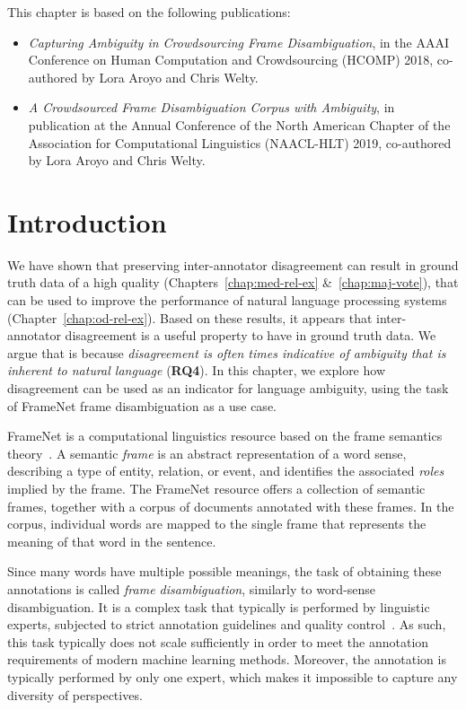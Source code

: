 This chapter is based on the following publications:
\begin{itemize}
    \item \textit{Capturing Ambiguity in Crowdsourcing Frame Disambiguation}, in the AAAI Conference on Human Computation and Crowdsourcing (HCOMP) 2018, co-authored by Lora Aroyo and Chris Welty.~\cite{DBLP:conf/hcomp/DumitracheAW18}
    
    \item \textit{A Crowdsourced Frame Disambiguation Corpus with Ambiguity}, in publication at the Annual Conference of the North American Chapter of the Association for Computational Linguistics (NAACL-HLT) 2019, co-authored by Lora Aroyo and Chris Welty.~\cite{dumitrache2019frames}
\end{itemize}


\section{Introduction}


We have shown that preserving inter-annotator disagreement can result in ground truth data of a high quality (Chapters~\ref{chap:med-rel-ex} \&~\ref{chap:maj-vote}), that can be used to improve the performance of natural language processing systems (Chapter~\ref{chap:od-rel-ex}). Based on these results, it appears that inter-annotator disagreement is a useful property to have in ground truth data. We argue that is because \textit{disagreement is often times indicative of ambiguity that is inherent to natural language} (\textbf{RQ4}). In this chapter, we explore how disagreement can be used as an indicator for language ambiguity, using the task of FrameNet frame disambiguation as a use case.

FrameNet is a computational linguistics resource based on the frame semantics theory~\cite{baker1998berkeley}. A semantic \textit{frame} is an abstract representation of a word sense, describing a type of entity, relation, or event, and identifies the associated \emph{roles} implied by the frame. The FrameNet resource offers a collection of semantic frames, together with a corpus of documents annotated with these frames. In the corpus, individual words are mapped to the single frame that represents the meaning of that word in the sentence.  

Since many words have multiple possible meanings, the task of obtaining these annotations is called \emph{frame disambiguation}, similarly to word-sense disambiguation.  It is a complex task that typically is performed by linguistic experts, subjected to strict annotation guidelines and quality control~\cite{baker2012framenet}. As such, this task typically does not scale sufficiently in order to meet the annotation requirements of modern machine learning methods. Moreover, the annotation is typically performed by only one expert, which makes it impossible to capture any diversity of perspectives.  

